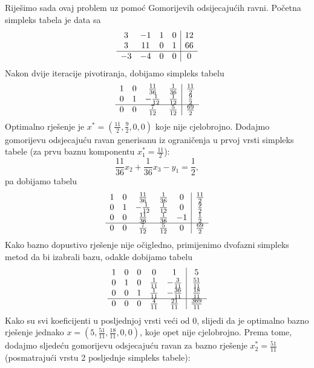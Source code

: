 \documentclass[a4paper, utf8, 11pt, colorlinks]{book}
\begin{document}
Riješimo sada ovaj problem uz pomoć Gomorijevih odsijecajućih ravni. 
Početna simpleks tabela je data sa 
$$\begin{array}{ccc c| c}
    3  & -1 & 1 &  0  & 12  \\
    3  & 11 & 0 &  1  & 66 \\ \hline
   -3  & -4 & 0 &  0  & 0
\end{array}$$
Nakon dvije iteracije pivotiranja, dobijamo simpleks tabelu 
$$\begin{array}{ccc c| c}
1 & 0 &  \frac{11}{36}   &  \frac{1}{36}  &  \frac{11}{2} \\
0 & 1 &  -\frac{1}{12}  &  \frac{1}{12}  &  \frac{9}{2}   \\ \hline
0 & 0 &  \frac{7}{12}   &  \frac{5}{12}  &  \frac{69}{2}
\end{array} $$
Optimalno rješenje je $x^* = (\frac{11}{2}, \frac{9}{2}, 0, 0)$ koje nije cjelobrojno. Dodajmo gomorijevu odsjecajuću ravan generisanu iz ograničenja u prvoj vrsti simpleks tabele (za prvu baznu komponentu $x_1^* = \frac{11}{2}$):
$$  \frac{11}{36} x_2 + \frac{1}{36} x_3 - y_1 = \frac{1}{2},$$
pa dobijamo tabelu 
$$\begin{array}{ccccc| c}
1 &  0 &   \frac{11}{36}  & \frac{1}{36}   &  0 & \frac{11}{2} \\
0 &  1 &   -\frac{1}{12}  & \frac{1}{12}   &  0 & \frac{9}{2} \\
0 &  0 &  \frac{11}{36}   &  \frac{1}{36}  & -1 & \frac{1}{2} \\ \hline
0 & 0  &  \frac{7}{12}    & \frac{5}{12}   &  0 & \frac{69}{2}
\end{array} $$
Kako bazno dopustivo rješenje nije očigledno, primijenimo dvofazni simpleks metod da bi izabrali bazu, odakle dobijamo tabelu 
$$\begin{array}{ccccc| c}
1   &   0       &   0   &   0             & 1              & 5 \\
0   &   1       &   0   &   \frac{1}{11}  & -\frac{3}{11}  & \frac{51}{11} \\
0   &   0       &   1   &   \frac{1}{11}  & -\frac{36}{11} &  \frac{18}{11} \\ \hline
0   &   0       &   0   &   \frac{4}{11}  & \frac{21}{11}  &  \frac{369}{11} \\
\end{array} $$
Kako su svi koeficijenti u posljednjoj vrsti veći od 0, slijedi da je optimalno bazno rješenje jednako $x=(5, \frac{51}{11}, \frac{18}{11}, 0, 0)$, koje opet nije cjelobrojno. 
 Prema tome, dodajmo sljedeću gomorijevu odsjecajuću ravan za bazno rješenje $x^*_2 = \frac{51}{11}$ (posmatrajući vrstu 2 posljednje simpleks tabele):
 
\end{document}
